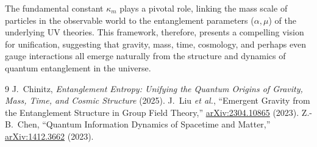 \documentclass[11pt]{article}
\begin{document}
The fundamental constant $\kappa_m$ plays a pivotal role, linking the mass scale of particles in the observable world to the entanglement parameters ($\alpha, \mu$) of the underlying UV theories. This framework, therefore, presents a compelling vision for unification, suggesting that gravity, mass, time, cosmology, and perhaps even gauge interactions all emerge naturally from the structure and dynamics of quantum entanglement in the universe.


\begin{thebibliography}{9}\setlength{\itemsep}{-0.25em}
 J.\ Chinitz, \emph{Entanglement Entropy: Unifying the Quantum Origins of Gravity, Mass, Time, and Cosmic Structure} (2025).
 J.\ Liu \textit{et al.}, “Emergent Gravity from the Entanglement Structure in Group Field Theory,” \href{https://arxiv.org/abs/2304.10865}{arXiv:2304.10865} (2023).
 Z.-B.\ Chen, “Quantum Information Dynamics of Spacetime and Matter,” \href{https://arxiv.org/abs/1412.3662}{arXiv:1412.3662} (2023).
\end{thebibliography}
\end{document}
